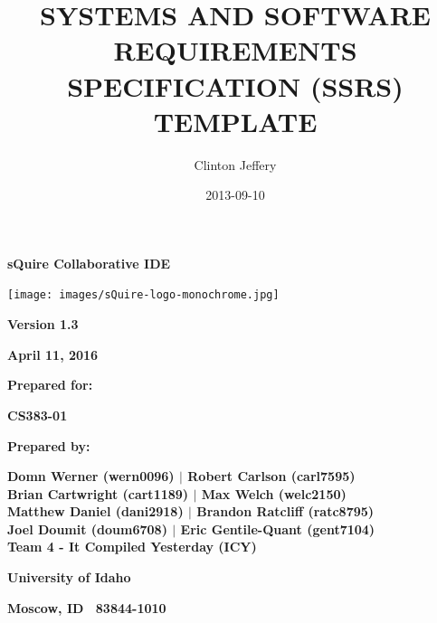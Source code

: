 \documentclass[twoside,letterpaper]{article}
\title{SYSTEMS AND SOFTWARE REQUIREMENTS SPECIFICATION (SSRS) TEMPLATE}
\author{Clinton Jeffery}
\date{2013-09-10}
\begin{document}
\clearpage\setcounter{page}{1}\pagestyle{Standard}




\bigskip

{\centering\bfseries
sQuire Collaborative IDE
\par}


\bigskip


\bigskip


\bigskip

\begin{center}
\texttt{[image: images/sQuire-logo-monochrome.jpg]}
\end{center}

\bigskip


\bigskip

{\centering\bfseries
Version 1.3
\par}

{\centering\bfseries
April 11, 2016
\par}


\bigskip


\bigskip

{\centering\bfseries
Prepared for:
\par}

{\centering\bfseries
CS383-01
\par}


\bigskip


\bigskip

{\centering\bfseries
Prepared by:
\par}

{\centering\bfseries
Domn Werner (wern0096) $\vert$ Robert Carlson (carl7595) \\ Brian Cartwright (cart1189) $\vert$ Max Welch (welc2150) \\ Matthew Daniel (dani2918) $\vert$ Brandon Ratcliff (ratc8795) \\ Joel Doumit (doum6708) $\vert$ Eric Gentile-Quant (gent7104) \\
Team 4 - It Compiled Yesterday (ICY)
\par}

{\centering\bfseries
University of Idaho
\par}

{\centering\bfseries
Moscow, ID \ 83844-1010
\par}

\end{document}
